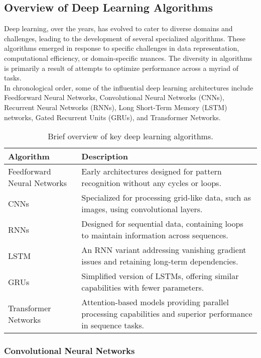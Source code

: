 \subsection{Overview of Deep Learning Algorithms}

Deep learning, over the years, has evolved to cater to diverse domains and challenges, leading to the development of several specialized algorithms. These algorithms emerged in response to specific challenges in data representation, computational efficiency, or domain-specific nuances. The diversity in algorithms is primarily a result of attempts to optimize performance across a myriad of tasks.\\

In chronological order, some of the influential deep learning architectures include Feedforward Neural Networks, Convolutional Neural Networks (CNNs), Recurrent Neural Networks (RNNs), Long Short-Term Memory (LSTM) networks, Gated Recurrent Units (GRUs), and Transformer Networks.

\begin{table}[h]
\centering
\begin{tabularx}{\linewidth}{|l|X|}
\hline
\textbf{Algorithm} & \textbf{Description} \\
\hline
Feedforward Neural Networks & Early architectures designed for pattern recognition without any cycles or loops. \\
\hline
CNNs & Specialized for processing grid-like data, such as images, using convolutional layers. \\
\hline
RNNs & Designed for sequential data, containing loops to maintain information across sequences. \\
\hline
LSTM & An RNN variant addressing vanishing gradient issues and retaining long-term dependencies. \\
\hline
GRUs & Simplified version of LSTMs, offering similar capabilities with fewer parameters. \\
\hline
Transformer Networks & Attention-based models providing parallel processing capabilities and superior performance in sequence tasks. \\
\hline
\end{tabularx}
\caption{Brief overview of key deep learning algorithms.}
\end{table}

\subsubsection*{Convolutional Neural Networks}

